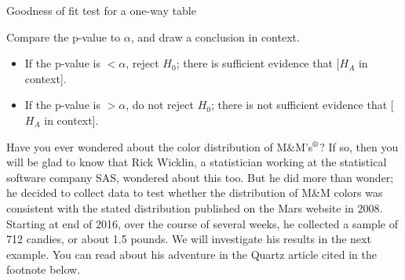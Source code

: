 \begin{onebox}{Goodness of fit test for a one-way table}
\begin{itemize}
\end{itemize}
 Compare the p-value to $\alpha$, and draw a conclusion in context.
\begin{itemize}\vspace{-1mm}
\setlength{\itemsep}{0mm}
\item[] If the p-value is $< \alpha$, reject $H_0$; there is sufficient evidence that [$H_A$ in context]. 
\item[] If the p-value is $> \alpha$, do not reject $H_0$; there is not sufficient evidence that [$H_A$ in context].
\end{itemize}
\end{onebox}


Have you ever wondered about the color distribution of M\&M's$^{\text{\textregistered}}$?  If so, then you will be glad to know that Rick Wicklin, a statistician working at the statistical software company SAS, wondered about this too.  But he did more than wonder; he decided to collect data to test whether the distribution of M\&M colors was consistent with the stated distribution published on the Mars website in 2008.  Starting at end of 2016, over the course of several weeks, he collected a sample of 712 candies, or about 1.5 pounds.  We will investigate his results in the next example.  You can read about his adventure in the Quartz article cited in the footnote below.\footnotemark 
{}

\D{\newpage}

